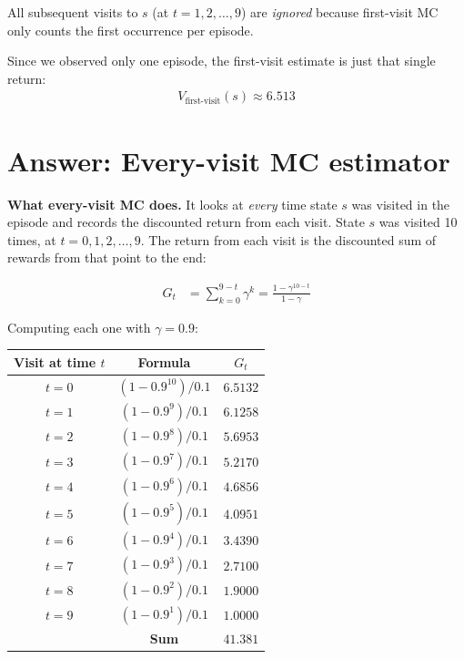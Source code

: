\documentclass[11pt]{article}
\begin{document}
All subsequent visits to $s$ (at $t = 1, 2, \ldots, 9$) are \textit{ignored} because first-visit MC only counts the first occurrence per episode.

Since we observed only one episode, the first-visit estimate is just that single return:
\begin{align}
    \boxed{V_{\text{first-visit}}(s) \approx 6.513}
\end{align}

\section*{Answer: Every-visit MC estimator}

\textbf{What every-visit MC does.} It looks at \textit{every} time state $s$ was visited in the episode and records the discounted return from each visit. State $s$ was visited 10 times, at $t = 0, 1, 2, \ldots, 9$. The return from each visit is the discounted sum of rewards from that point to the end:

\begin{align}
    G_t &= \sum_{k=0}^{9-t} \gamma^k = \frac{1 - \gamma^{10-t}}{1 - \gamma}
\end{align}

Computing each one with $\gamma = 0.9$:

\begin{table}[H]
    \centering
    \begin{tabular}{ccc}
        \toprule
        \textbf{Visit at time $t$} & \textbf{Formula} & \textbf{$G_t$} \\
        \midrule
        $t = 0$ & $(1 - 0.9^{10})/0.1$ & $6.5132$ \\
        $t = 1$ & $(1 - 0.9^{9})/0.1$ & $6.1258$ \\
        $t = 2$ & $(1 - 0.9^{8})/0.1$ & $5.6953$ \\
        $t = 3$ & $(1 - 0.9^{7})/0.1$ & $5.2170$ \\
        $t = 4$ & $(1 - 0.9^{6})/0.1$ & $4.6856$ \\
        $t = 5$ & $(1 - 0.9^{5})/0.1$ & $4.0951$ \\
        $t = 6$ & $(1 - 0.9^{4})/0.1$ & $3.4390$ \\
        $t = 7$ & $(1 - 0.9^{3})/0.1$ & $2.7100$ \\
        $t = 8$ & $(1 - 0.9^{2})/0.1$ & $1.9000$ \\
        $t = 9$ & $(1 - 0.9^{1})/0.1$ & $1.0000$ \\
        \midrule
        & \textbf{Sum} & $\mathbf{41.381}$ \\
        \bottomrule
    \end{tabular}
\end{table}
\end{document}
